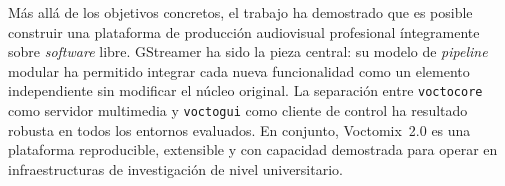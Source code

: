 \vspace{0.3cm}

Más allá de los objetivos concretos, el trabajo ha demostrado que es posible construir
una plataforma de producción audiovisual profesional íntegramente sobre \textit{software} libre.
GStreamer ha sido la pieza central: su modelo de \textit{pipeline} modular ha permitido integrar
cada nueva funcionalidad como un elemento independiente sin modificar el núcleo original.
La separación entre \texttt{voctocore} como servidor multimedia y \texttt{voctogui} como
cliente de control ha resultado robusta en todos los entornos evaluados. En conjunto,
Voctomix~2.0 es una plataforma reproducible, extensible y con capacidad demostrada para
operar en infraestructuras de investigación de nivel universitario.
